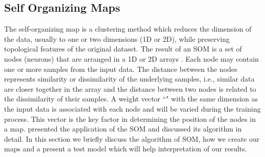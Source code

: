  \subsection{Self Organizing Maps}
 \label{sec: som}
 
 The self-organizing map is a clustering method which reduces the dimension of the data, usually to one or two dimensions (1D or 2D), while preserving topological features of the original dataset.
 The result of an SOM is a set of nodes (neurons) that are arranged in a 1D or 2D arrays \citep{Kohonen98}. 
 Each node may contain one or more samples from the input data.
 The distance between the nodes represents similarity or dissimilarity of the underlying samples, i.e., similar data are closer together in the array and the distance between two nodes is related to the dissimilarity of their samples.
 A weight vector ``" with the same dimension as the input data is associated with each node and will be varied during the training process.
 This vector is the key factor in determining the position of the nodes in a map.
 \cite{Geach12} presented the application of the SOM and discussed its algorithm in detail.
 In this section we briefly discuss the algorithm of SOM, how we create our maps and a present a  test model which will help interpretation of our results. 
 
